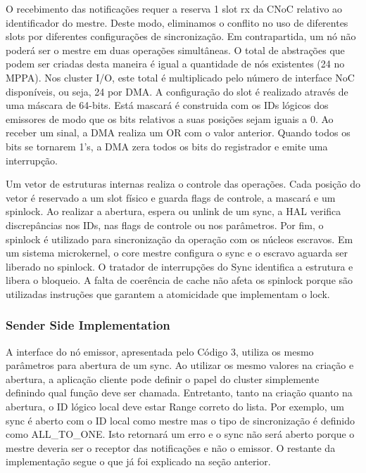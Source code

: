 				O recebimento das notificações requer a reserva 1 slot rx da CNoC relativo ao identificador do mestre.
				Deste modo, eliminamos o conflito no uso de diferentes slots por diferentes configurações de sincronização.
				Em contrapartida, um nó não poderá ser o mestre em duas operações simultâneas.
				O total de abstrações que podem ser criadas desta maneira é igual a quantidade de nós existentes (24 no MPPA).
				Nos cluster I/O, este total é multiplicado pelo número de interface NoC disponíveis, ou seja, 24 por DMA.
				A configuração do slot é realizado através de uma máscara de 64-bits.
				Está mascará é construida com os IDs lógicos dos emissores de modo que os bits relativos a suas posições sejam iguais a 0.
				Ao receber um sinal, a DMA realiza um OR com o valor anterior.
				Quando todos os bits se tornarem 1's, a DMA zera todos os bits do registrador e emite uma interrupção.

				Um vetor de estruturas internas realiza o controle das operações.
				Cada posição do vetor é reservado a um slot físico e guarda flags de controle, a mascará e um spinlock.
				Ao realizar a abertura, espera ou unlink de um sync, a HAL verifica discrepâncias nos IDs, nas flags de controle ou nos parâmetros.
				Por fim, o spinlock é utilizado para sincronização da operação com os núcleos escravos.
				Em um sistema microkernel, o core mestre configura o sync e o escravo aguarda ser liberado no spinlock.
				O tratador de interrupções do Sync identifica a estrutura e libera o bloqueio.
				A falta de coerência de cache não afeta os spinlock porque são utilizadas instruções que garantem a atomicidade que implementam o lock.


			\subsubsection{Sender Side Implementation}

				A interface do nó emissor, apresentada pelo Código 3, utiliza os mesmo parâmetros para abertura de um sync.
				Ao utilizar os mesmo valores na criação e abertura, a aplicação cliente pode definir o papel do cluster simplemente definindo qual função deve ser chamada.
				Entretanto, tanto na criação quanto na abertura, o ID lógico local deve estar Range correto do lista.
				Por exemplo, um sync é aberto com o ID local como mestre mas o tipo de sincronização é definido como ALL\_TO\_ONE.
				Isto retornará um erro e o sync não será aberto porque o mestre deveria ser o receptor das notificações e não o emissor.
				O restante da implementação segue o que já foi explicado na seção anterior.

